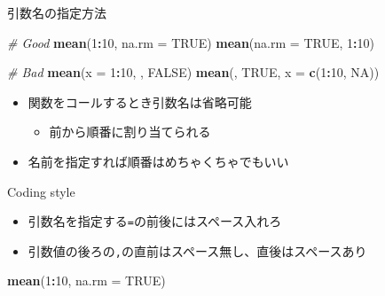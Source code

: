 \documentclass[ignorenonframetext,]{beamer}
\newenvironment{Shaded}{\begin{snugshade}}{\end{snugshade}}
\newcommand{\KeywordTok}[1]{\textcolor[rgb]{0.13,0.29,0.53}{\textbf{#1}}}
\newcommand{\DataTypeTok}[1]{\textcolor[rgb]{0.13,0.29,0.53}{#1}}
\newcommand{\DecValTok}[1]{\textcolor[rgb]{0.00,0.00,0.81}{#1}}
\newcommand{\CommentTok}[1]{\textcolor[rgb]{0.56,0.35,0.01}{\textit{#1}}}
\newcommand{\OtherTok}[1]{\textcolor[rgb]{0.56,0.35,0.01}{#1}}
\newcommand{\OperatorTok}[1]{\textcolor[rgb]{0.81,0.36,0.00}{\textbf{#1}}}
\newcommand{\NormalTok}[1]{#1}
\providecommand{\tightlist}{%
  \setlength{\itemsep}{0pt}\setlength{\parskip}{0pt}}
\begin{document}
\begin{frame}[fragile]{引数名の指定方法}

\begin{Shaded}
\begin{Highlighting}[]
\CommentTok{# Good}
\KeywordTok{mean}\NormalTok{(}\DecValTok{1}\OperatorTok{:}\DecValTok{10}\NormalTok{, }\DataTypeTok{na.rm =} \OtherTok{TRUE}\NormalTok{)}
\KeywordTok{mean}\NormalTok{(}\DataTypeTok{na.rm =} \OtherTok{TRUE}\NormalTok{, }\DecValTok{1}\OperatorTok{:}\DecValTok{10}\NormalTok{)}

\CommentTok{# Bad}
\KeywordTok{mean}\NormalTok{(}\DataTypeTok{x =} \DecValTok{1}\OperatorTok{:}\DecValTok{10}\NormalTok{, , }\OtherTok{FALSE}\NormalTok{)}
\KeywordTok{mean}\NormalTok{(, }\OtherTok{TRUE}\NormalTok{, }\DataTypeTok{x =} \KeywordTok{c}\NormalTok{(}\DecValTok{1}\OperatorTok{:}\DecValTok{10}\NormalTok{, }\OtherTok{NA}\NormalTok{))}
\end{Highlighting}
\end{Shaded}

\begin{itemize}
\tightlist
\item
  関数をコールするとき引数名は省略可能

  \begin{itemize}
  \tightlist
  \item
    前から順番に割り当てられる
  \end{itemize}
\item
  名前を指定すれば順番はめちゃくちゃでもいい
\end{itemize}

\end{frame}

\begin{frame}[fragile]{Coding style}

\begin{itemize}
\tightlist
\item
  引数名を指定する\texttt{=}の前後にはスペース入れろ
\item
  引数値の後ろの\texttt{,}の直前はスペース無し、直後はスペースあり
\end{itemize}

\begin{Shaded}
\begin{Highlighting}[]
\KeywordTok{mean}\NormalTok{(}\DecValTok{1}\OperatorTok{:}\DecValTok{10}\NormalTok{, }\DataTypeTok{na.rm =} \OtherTok{TRUE}\NormalTok{)}
\end{Highlighting}
\end{Shaded}

\end{frame}
\end{document}
